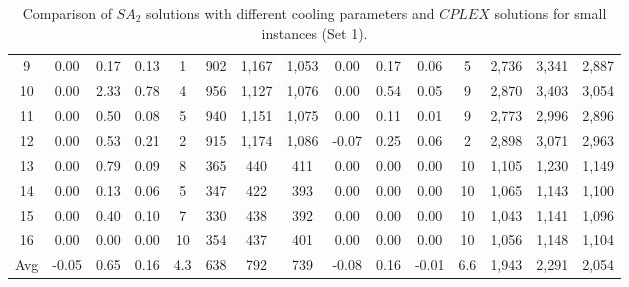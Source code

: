 \documentclass[11pt]{article}
\begin{document}
\begin{table}[H]
\begin{tabular}{ccccccccccccccc}
\multicolumn{1}{c|}{9} & 0.00 & 0.17 & \multicolumn{1}{c|}{0.13} & \multicolumn{1}{c|}{1} & 902 & 1,167 & \multicolumn{1}{c|}{1,053} & 0.00 & 0.17 & \multicolumn{1}{c|}{0.06} & \multicolumn{1}{c|}{5} & 2,736 & 3,341 & 2,887 \\
\multicolumn{1}{c|}{10} & 0.00 & 2.33 & \multicolumn{1}{c|}{0.78} & \multicolumn{1}{c|}{4} & 956 & 1,127 & \multicolumn{1}{c|}{1,076} & 0.00 & 0.54 & \multicolumn{1}{c|}{0.05} & \multicolumn{1}{c|}{9} & 2,870 & 3,403 & 3,054 \\
\multicolumn{1}{c|}{11} & 0.00 & 0.50 & \multicolumn{1}{c|}{0.08} & \multicolumn{1}{c|}{5} & 940 & 1,151 & \multicolumn{1}{c|}{1,075} & 0.00 & 0.11 & \multicolumn{1}{c|}{0.01} & \multicolumn{1}{c|}{9} & 2,773 & 2,996 & 2,896 \\
\multicolumn{1}{c|}{12} & 0.00 & 0.53 & \multicolumn{1}{c|}{0.21} & \multicolumn{1}{c|}{2} & 915 & 1,174 & \multicolumn{1}{c|}{1,086} & -0.07 & 0.25 & \multicolumn{1}{c|}{0.06} & \multicolumn{1}{c|}{2} & 2,898 & 3,071 & 2,963 \\ \hline
\multicolumn{1}{c|}{13} & 0.00 & 0.79 & \multicolumn{1}{c|}{0.09} & \multicolumn{1}{c|}{8} & 365 & 440 & \multicolumn{1}{c|}{411} & 0.00 & 0.00 & \multicolumn{1}{c|}{0.00} & \multicolumn{1}{c|}{10} & 1,105 & 1,230 & 1,149 \\
\multicolumn{1}{c|}{14} & 0.00 & 0.13 & \multicolumn{1}{c|}{0.06} & \multicolumn{1}{c|}{5} & 347 & 422 & \multicolumn{1}{c|}{393} & 0.00 & 0.00 & \multicolumn{1}{c|}{0.00} & \multicolumn{1}{c|}{10} & 1,065 & 1,143 & 1,100 \\
\multicolumn{1}{c|}{15} & 0.00 & 0.40 & \multicolumn{1}{c|}{0.10} & \multicolumn{1}{c|}{7} & 330 & 438 & \multicolumn{1}{c|}{392} & 0.00 & 0.00 & \multicolumn{1}{c|}{0.00} & \multicolumn{1}{c|}{10} & 1,043 & 1,141 & 1,096 \\
\multicolumn{1}{c|}{16} & 0.00 & 0.00 & \multicolumn{1}{c|}{0.00} & \multicolumn{1}{c|}{10} & 354 & 437 & \multicolumn{1}{c|}{401} & 0.00 & 0.00 & \multicolumn{1}{c|}{0.00} & \multicolumn{1}{c|}{10} & 1,056 & 1,148 & 1,104 \\\hline \hline

\multicolumn{1}{c|}{Avg} & -0.05 & 0.65 & \multicolumn{1}{c|}{0.16} & \multicolumn{1}{c|}{4.3} & 638 & 792 & \multicolumn{1}{c|}{739} & -0.08 & 0.16 & \multicolumn{1}{c|}{-0.01} & \multicolumn{1}{c|}{6.6} & 1,943 & 2,291 & 2,054 \\ 
 \bottomrule
\end{tabular}
\caption{Comparison of $SA_2$ solutions with different cooling parameters and $CPLEX$ solutions for small instances (Set 1).}
	\label{sa_cooling_effects}%
\end{table}
\end{document}
